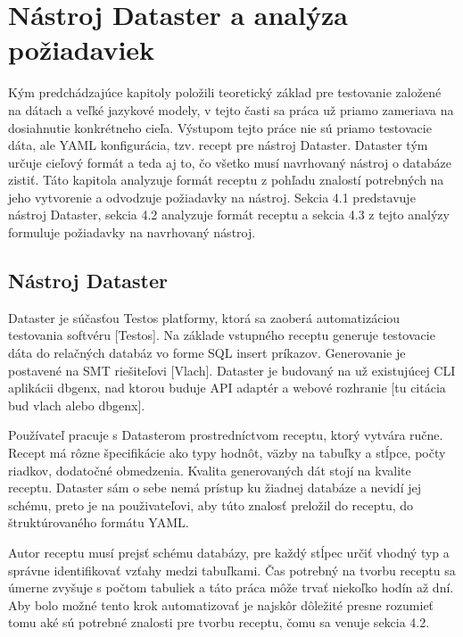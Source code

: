 \chapter{Nástroj Dataster a analýza požiadaviek}
\label{ch:kap4}

Kým predchádzajúce kapitoly položili teoretický základ pre testovanie založené na dátach a veľké jazykové modely, v tejto časti sa práca už priamo zameriava na dosiahnutie konkrétneho cieľa. Výstupom tejto práce nie sú priamo testovacie dáta, ale YAML konfigurácia, tzv. recept pre nástroj Dataster. Dataster  tým určuje cieľový formát a teda aj to, čo všetko musí navrhovaný nástroj o databáze zistiť. Táto kapitola analyzuje formát receptu z pohľadu znalostí potrebných na jeho vytvorenie a odvodzuje požiadavky na nástroj. Sekcia 4.1 predstavuje nástroj Dataster, sekcia 4.2 analyzuje formát receptu a sekcia 4.3 z tejto analýzy formuluje požiadavky na navrhovaný nástroj.

\section{Nástroj Dataster}
Dataster je súčasťou Testos platformy, ktorá sa zaoberá automatizáciou testovania softvéru [Testos]. Na základe vstupného receptu generuje testovacie dáta do relačných databáz vo forme SQL insert príkazov. Generovanie je postavené na SMT riešiteľovi [Vlach].  Dataster je budovaný na už existujúcej CLI aplikácii dbgenx, nad ktorou buduje API adaptér a webové rozhranie [tu citácia bud vlach alebo dbgenx]. 

Používateľ pracuje s Datasterom prostredníctvom receptu, ktorý vytvára ručne. Recept má rôzne špecifikácie ako typy hodnôt, väzby na tabuľky a stĺpce, počty riadkov, dodatočné obmedzenia. Kvalita generovaných dát stojí na kvalite receptu. Dataster sám o sebe nemá prístup ku žiadnej databáze a nevidí jej schému, preto je na použivateľovi, aby túto znalosť preložil do receptu, do štruktúrovaného formátu YAML. 

Autor receptu musí prejsť schému databázy, pre každý stĺpec určiť vhodný typ a správne identifikovať vzťahy medzi tabuľkami. Čas potrebný na tvorbu receptu sa úmerne zvyšuje s počtom tabuliek a táto práca môže trvať niekoľko hodín až dní. Aby bolo možné tento krok automatizovať je najskôr dôležité presne rozumieť tomu aké sú potrebné znalosti pre tvorbu receptu, čomu sa venuje sekcia 4.2.


